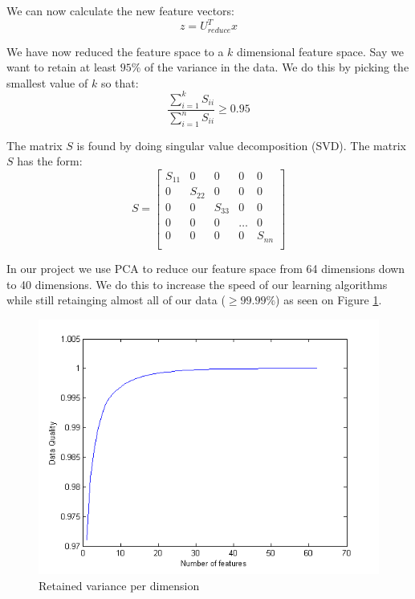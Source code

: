 We can now calculate the new feature vectors:
\begin{equation}
z = U_{reduce}^Tx
\end{equation}

We have now reduced the feature space to a $k$ dimensional feature space.
Say we want to retain at least $95\%$ of the variance in the data.
We do this by picking the smallest value of $k$ so that:
\begin{equation}
\frac{\displaystyle\sum^{k}_{i=1} S_{ii}}{\displaystyle\sum^{n}_{i=1} S_{ii}} \geq 0.95
\end{equation}

The matrix $S$ is found by doing singular value decomposition (SVD). The matrix $S$ has the form:
\begin{equation}
S =  
\begin{bmatrix}
S_{11} & 0 & 0 & 0 & 0 \\
0 & S_{22} & 0 & 0 & 0 \\
0 & 0 & S_{33} & 0 & 0 \\
0 & 0 & 0 & \dots & 0 \\
0 & 0 & 0 & 0 & S_{nn} \\
\end{bmatrix}
\end{equation}

In our project we use PCA to reduce our feature space from 64 dimensions down to 40 dimensions.
We do this to increase the speed of our learning algorithms while still retainging almost all of our data ($\geq 99.99\%$) as seen on Figure \ref{fig:pca-on-our-data}.

\begin{figure}[H]
\centering
\includegraphics[scale = 0.8]{billeder/pca-on-our-data}
\caption{ Retained variance per dimension}
\label{fig:pca-on-our-data}
\end{figure}

